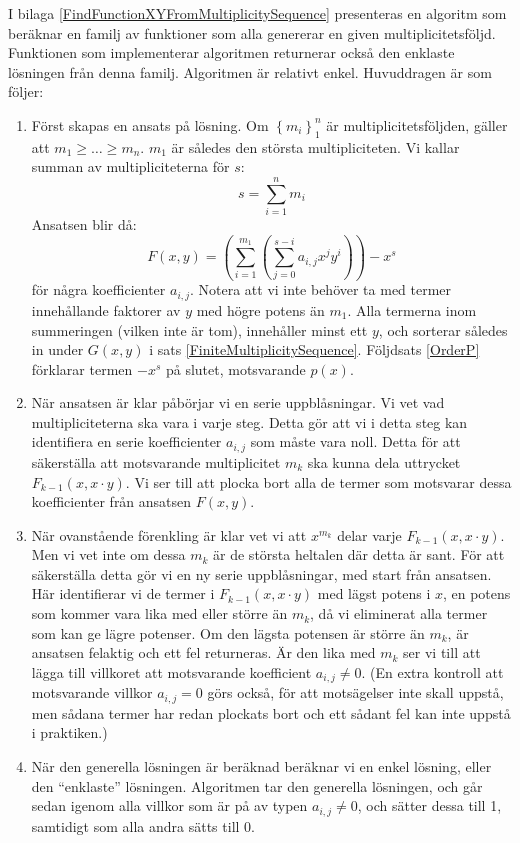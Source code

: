 I bilaga \ref{FindFunctionXYFromMultiplicitySequence} presenteras en algoritm som beräknar en familj av funktioner som alla genererar en given multiplicitetsföljd. Funktionen som implementerar algoritmen returnerar också den enklaste lösningen från denna familj. Algoritmen är relativt enkel. Huvuddragen är som följer:

\begin{enumerate}
\item Först skapas en ansats på lösning. Om $\left\{m_i\right\}_1^n$ är multiplicitetsföljden, gäller att $m_1 \geq \ldots \geq m_n$. $m_1$ är således den största multipliciteten. Vi kallar summan av multipliciteterna för $s$:
\[s=\sum_{i=1}^{n} m_i\]
Ansatsen blir då:
\[F(x,y)=\left(\sum_{i=1}^{m_1}\left(\sum_{j=0}^{s-i} a_{i,j} x^j y^i\right)\right)-x^s\]
för några koefficienter $a_{i,j}$. Notera att vi inte behöver ta med termer innehållande faktorer av $y$ med högre potens än $m_1$. Alla termerna inom summeringen (vilken inte är tom), innehåller minst ett $y$, och sorterar således in under $G(x,y)$ i sats \ref{FiniteMultiplicitySequence}. Följdsats \ref{OrderP} förklarar termen $-x^s$ på slutet, motsvarande $p(x)$.

\item När ansatsen är klar påbörjar vi en serie uppblåsningar. Vi vet vad multipliciteterna ska vara i varje steg. Detta gör att vi i detta steg kan identifiera en serie koefficienter $a_{i,j}$ som måste vara noll. Detta för att säkerställa att motsvarande multiplicitet $m_k$ ska kunna dela uttrycket $F_{k-1}(x,x\cdot y)$. Vi ser till att plocka bort alla de termer som motsvarar dessa koefficienter från ansatsen $F(x,y)$.

\item När ovanstående förenkling är klar vet vi att $x^{m_k}$ delar varje $F_{k-1}(x,x\cdot y)$. Men vi vet inte om dessa $m_k$ är de största heltalen där detta är sant. För att säkerställa detta gör vi en ny serie uppblåsningar, med start från ansatsen. Här identifierar vi de termer i $F_{k-1}(x,x\cdot y)$ med lägst potens i $x$, en potens som kommer vara lika med eller större än $m_k$, då vi eliminerat alla termer som kan ge lägre potenser. Om den lägsta potensen är större än $m_k$, är ansatsen felaktig och ett fel returneras. Är den lika med $m_k$ ser vi till att lägga till villkoret att motsvarande koefficient $a_{i,j} \neq 0$. (En extra kontroll att motsvarande villkor $a_{i,j}=0$ görs också, för att motsägelser inte skall uppstå, men sådana termer har redan plockats bort och ett sådant fel kan inte uppstå i praktiken.)

\item När den generella lösningen är beräknad beräknar vi en enkel lösning, eller den ``enklaste'' lösningen. Algoritmen tar den generella lösningen, och går sedan igenom alla villkor som är på av typen $a_{i,j}\neq 0$, och sätter dessa till 1, samtidigt som alla andra sätts till 0.
\end{enumerate}

